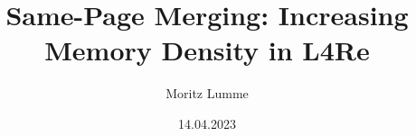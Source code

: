 \title[SPMM in L4Re]{Same-Page Merging: Increasing Memory Density in L4Re}
\author{Moritz Lumme}
\institute[TU Dresden]{}
\date{14.04.2023}

\begin{frame}
  \titlepage
\end{frame}
